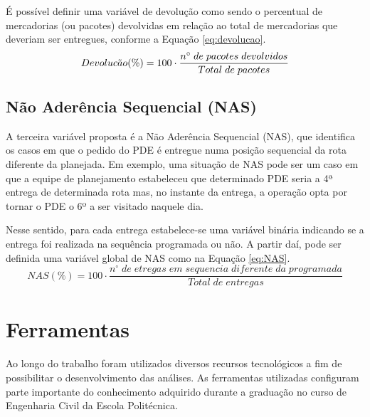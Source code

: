 É possível definir uma variável de devolução como sendo o percentual de mercadorias (ou pacotes) devolvidas em relação ao total de mercadorias que deveriam ser entregues, conforme a Equação \ref{eq:devolucao}.
%
\begin{equation} \label{eq:devolucao}
    Devoluc\Tilde{a}o (\%) = 100 \cdot \frac{n^{\circ} \; de \; pacotes \; devolvidos}{Total \; de \; pacotes}
\end{equation}

\subsection{Não Aderência Sequencial (NAS)}

A terceira variável proposta é a Não Aderência Sequencial (NAS), que identifica os casos em que o pedido do PDE é entregue numa posição sequencial da rota diferente da planejada. 
Em exemplo, uma situação de NAS pode ser um caso em que a equipe de planejamento estabeleceu que determinado PDE seria a 4ª entrega de determinada rota mas, no instante da entrega, a operação opta por tornar o PDE o 6º a ser visitado naquele dia.

Nesse sentido, para cada entrega estabelece-se uma variável binária indicando se a entrega foi realizada na sequência programada ou não.
A partir daí, pode ser definida uma variável global de NAS como na Equação \ref{eq:NAS}.
%
\begin{equation} \label{eq:NAS}
    NAS(\%) = 100 \cdot \frac{n^{\circ} \; de \; etregas \; em \; sequencia \; diferente \; da \; programada}{Total \; de \; entregas} 
\end{equation}

\section{Ferramentas} \label{sec:ferramentas} 

Ao longo do trabalho foram utilizados diversos recursos tecnológicos a fim de possibilitar o desenvolvimento das análises.
%
As ferramentas utilizadas configuram parte importante do conhecimento adquirido durante a graduação no curso de Engenharia Civil da Escola Politécnica.

